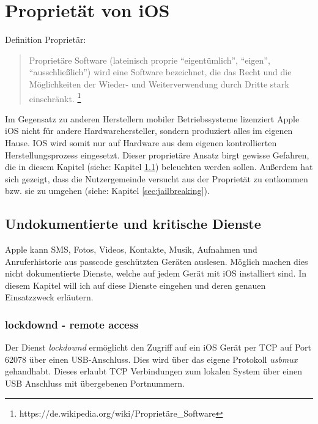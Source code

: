 \section{Proprietät von iOS}
	Definition Proprietär:
	\begin{quote}
		Proprietäre Software (lateinisch proprie "`eigentümlich"', "`eigen"',
		"`ausschließlich"') wird eine Software bezeichnet, die das Recht und die
		Möglichkeiten der Wieder- und Weiterverwendung durch Dritte stark einschränkt.
		\footnote{https://de.wikipedia.org/wiki/Proprietäre\_Software}
	\end{quote}
	Im Gegensatz zu anderen Herstellern mobiler Betriebssysteme lizenziert Apple
	iOS nicht für andere Hardwarehersteller, sondern produziert alles im
	eigenen Hause. IOS wird somit nur auf Hardware aus dem eigenen kontrollierten
	Herstellungsprozess eingesetzt. Dieser proprietäre Ansatz birgt gewisse
	Gefahren, die in diesem Kapitel (siehe: Kapitel
	\ref{sec:undocumented-services}) beleuchten werden sollen. Außerdem hat sich gezeigt, dass die Nutzergemeinde
	versucht aus der Proprietät zu entkommen bzw. sie zu umgehen (siehe: Kapitel
	\ref{sec:jailbreaking}).
	
	\subsection{Undokumentierte und kritische Dienste}\label{sec:undocumented-services}
		Apple kann SMS, Fotos, Videos, Kontakte, Musik, Aufnahmen und Anruferhistorie
		aus passcode geschützten Geräten auslesen. Möglich machen dies nicht
		dokumentierte Dienste, welche auf jedem Gerät mit iOS installiert sind. In
		diesem Kapitel will ich auf diese Dienste eingehen und deren genauen
		Einsatzzweck erläutern.
		\subsubsection{lockdownd - remote access}
			Der Dienst \textsl{lockdownd} ermöglicht den Zugriff auf ein iOS Gerät
			per TCP auf Port 62078 über einen USB-Anschluss. Dies wird über das eigene
			Protokoll \textsl{usbmux} gehandhabt. Dieses erlaubt TCP Verbindungen zum
			lokalen System über einen USB Anschluss mit übergebenen	Portnummern.
